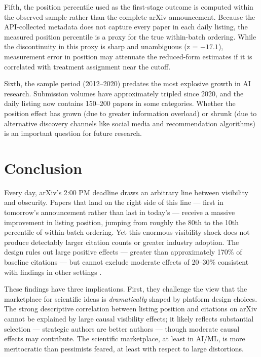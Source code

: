 \documentclass[12pt]{article}
\begin{document}
Fifth, the position percentile used as the first-stage outcome is computed within the observed sample rather than the complete arXiv announcement. Because the API-collected metadata does not capture every paper in each daily listing, the measured position percentile is a proxy for the true within-batch ordering. While the discontinuity in this proxy is sharp and unambiguous (z = $-17.1$), measurement error in position may attenuate the reduced-form estimates if it is correlated with treatment assignment near the cutoff.

Sixth, the sample period (2012--2020) predates the most explosive growth in AI research. Submission volumes have approximately tripled since 2020, and the daily listing now contains 150--200 papers in some categories. Whether the position effect has grown (due to greater information overload) or shrunk (due to alternative discovery channels like social media and recommendation algorithms) is an important question for future research.


\section{Conclusion}

Every day, arXiv's 2:00 PM deadline draws an arbitrary line between visibility and obscurity. Papers that land on the right side of this line --- first in tomorrow's announcement rather than last in today's --- receive a massive improvement in listing position, jumping from roughly the 80th to the 10th percentile of within-batch ordering. Yet this enormous visibility shock does not produce detectably larger citation counts or greater industry adoption. The design rules out large positive effects --- greater than approximately 170\% of baseline citations --- but cannot exclude moderate effects of 20--30\% consistent with findings in other settings \citep{feenberg2017}.

These findings have three implications. First, they challenge the view that the marketplace for scientific ideas is \textit{dramatically} shaped by platform design choices. The strong descriptive correlation between listing position and citations on arXiv \citep{haque2009, haque2010, dietrich2008} cannot be explained by large causal visibility effects; it likely reflects substantial selection --- strategic authors are better authors --- though moderate causal effects may contribute. The scientific marketplace, at least in AI/ML, is more meritocratic than pessimists feared, at least with respect to large distortions.
\end{document}
